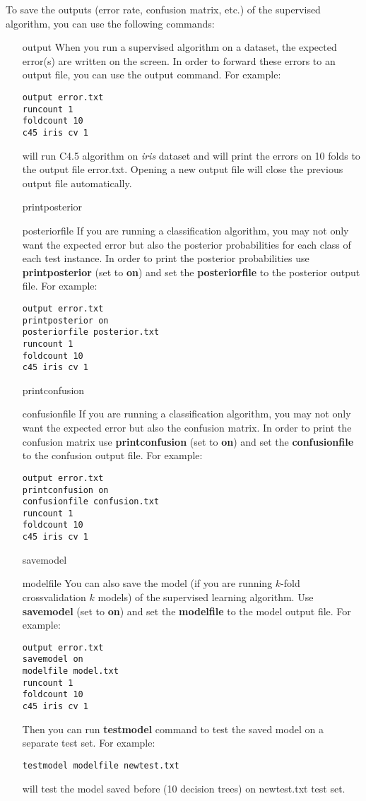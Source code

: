 \documentclass[a4paper,12pt]{book}
\begin{document}
To save the outputs (error rate, confusion matrix, etc.) of the supervised algorithm, you can use the following commands:
\begin{itemize}
\item[output] When you run a supervised algorithm on a dataset, the expected error(s) are written on the screen. In order to forward these errors to an output file, you can use the output command. For example:
\begin{verbatim}
output error.txt
runcount 1
foldcount 10
c45 iris cv 1
\end{verbatim} 
will run C4.5 algorithm on {\em iris} dataset and will print the errors on 10 folds to the output file error.txt. Opening a new output file will close the previous output file automatically.
\item[printposterior]
\item[posteriorfile] If you are running a classification algorithm, you may not only want the expected error but also the posterior probabilities for each class of each test instance. In order to print the posterior probabilities use {\bf printposterior} (set to {\bf on}) and set the {\bf posteriorfile} to the posterior output file. For example:
\begin{verbatim}
output error.txt
printposterior on
posteriorfile posterior.txt
runcount 1
foldcount 10
c45 iris cv 1
\end{verbatim} 
\item[printconfusion]
\item[confusionfile] If you are running a classification algorithm, you may not only want the expected error but also the confusion matrix. In order to print the confusion matrix use {\bf printconfusion} (set to {\bf on}) and set the {\bf confusionfile} to the confusion output file. For example:
\begin{verbatim}
output error.txt
printconfusion on
confusionfile confusion.txt
runcount 1
foldcount 10
c45 iris cv 1
\end{verbatim} 
\item[savemodel]
\item[modelfile] You can also save the model (if you are running $k$-fold crossvalidation $k$ models) of the supervised learning algorithm. Use {\bf savemodel} (set to {\bf on}) and set the {\bf modelfile} to the model output file. For example:
\begin{verbatim}
output error.txt
savemodel on
modelfile model.txt
runcount 1
foldcount 10
c45 iris cv 1
\end{verbatim}
Then you can run {\bf testmodel} command to test the saved model on a separate test set. For example:
\begin{verbatim}
testmodel modelfile newtest.txt
\end{verbatim}
will test the model saved before (10 decision trees) on newtest.txt test set.
\end{itemize}
\end{document}
